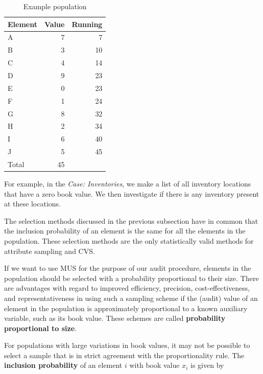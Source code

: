 \documentclass[12pt,a4paper]{memoir}
\begin{document}
\begin{table}[htbp]
\centering
\begin{tabular}{l r r}
\toprule
Element & \multicolumn{1}{c}{Value} & \multicolumn{1}{c}{Running} \\
\midrule
A & 7 & 7 \\
B & 3 & 10 \\
C & 4 & 14 \\
D & 9 & 23 \\
E & 0 & 23 \\
F & 1 & 24 \\
G & 8 & 32 \\
H & 2 & 34 \\
I & 6 & 40 \\
J & 5 & 45 \\
\midrule
Total & 45 & \\
\bottomrule
\end{tabular}
\caption{Example population}
\label{tab:example_pop_2}
\end{table}

For example, in the \emph{Case: Inventories}, we make a list of all inventory locations that have a zero book value. We then investigate if there is any inventory present at these locations.

\bigskip
The selection methods discussed in the previous subsection have in common that the inclusion probability of an element is the same for all the elements in the population. These selection methods are the only statistically valid methods for attribute sampling and CVS.

If we want to use MUS for the purpose of our audit procedure, elements in the population should be selected with a probability proportional to their size. There are advantages with regard to improved efficiency, precision, cost-effectiveness, and representativeness in using such a sampling scheme if the (audit) value of an element in the population is approximately proportional to a known auxiliary variable, such as its book value. These schemes are called \textbf{probability proportional to size}.

For populations with large variations in book values, it may not be possible to select a sample that is in strict agreement with the proportionality rule. The \textbf{inclusion probability} of an element $i$ with book value $x_i$ is given by
\end{document}
